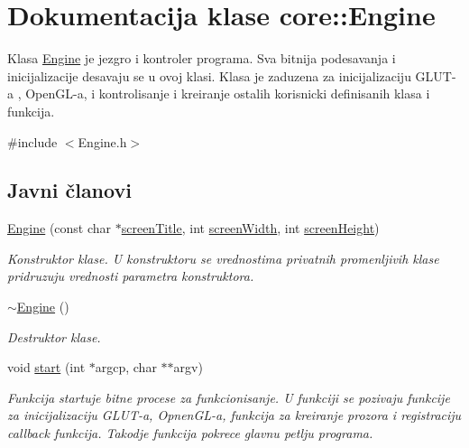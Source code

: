 \hypertarget{classcore_1_1Engine}{}\section{Dokumentacija klase core\+:\+:Engine}
\label{classcore_1_1Engine}


Klasa \hyperlink{classcore_1_1Engine}{Engine} je jezgro i kontroler programa. Sva bitnija podesavanja i inicijalizacije desavaju se u ovoj klasi. Klasa je zaduzena za inicijalizaciju G\+L\+U\+T-\/a , Open\+G\+L-\/a, i kontrolisanje i kreiranje ostalih korisnicki definisanih klasa i funkcija.  




{\ttfamily \#include $<$Engine.\+h$>$}

\subsection*{Javni članovi}
\begin{DoxyCompactItemize}
\item 
\hyperlink{classcore_1_1Engine_a9ca4bcdbd363e861fea0e15fbdbf7016}{Engine} (const char $\ast$\hyperlink{classcore_1_1Engine_ad695d2314128b2500074282b10139804}{screen\+Title}, int \hyperlink{classcore_1_1Engine_a69e16377fb9f9420b7147e0465abd1f7}{screen\+Width}, int \hyperlink{classcore_1_1Engine_a40fe67e2a2dbbc34c1955fa2b28d87bc}{screen\+Height})
\begin{DoxyCompactList}\small\item\em Konstruktor klase. U konstruktoru se vrednostima privatnih promenljivih klase pridruzuju vrednosti parametra konstruktora. \end{DoxyCompactList}\item 
\hyperlink{classcore_1_1Engine_afadff2634c914c9f6c4ade95e78ff693}{$\sim$\+Engine} ()
\begin{DoxyCompactList}\small\item\em Destruktor klase. \end{DoxyCompactList}\item 
void \hyperlink{classcore_1_1Engine_ac0cb11890396ccdf5100bc73045c4d38}{start} (int $\ast$argcp, char $\ast$$\ast$argv)
\begin{DoxyCompactList}\small\item\em Funkcija startuje bitne procese za funkcionisanje. U funkciji se pozivaju funkcije za inicijalizaciju G\+L\+U\+T-\/a, Opnen\+G\+L-\/a, funkcija za kreiranje prozora i registraciju callback funkcija. Takodje funkcija pokrece glavnu petlju programa. \end{DoxyCompactList}\end{DoxyCompactItemize}
